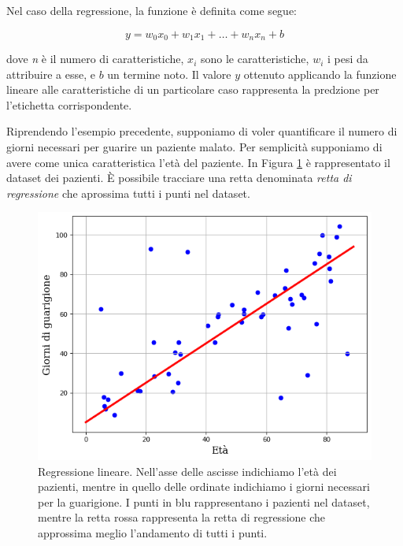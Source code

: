 \documentclass[a4paper,12pt]{report}
\begin{document}
Nel caso della regressione, la funzione è definita come segue: 

\begin{equation*}
    y  = w_0x_0 + w_1x_1 + \dots + w_nx_n + b
\end{equation*}

\noindent dove \textit{n} è il numero di caratteristiche, $x_i$ sono le caratteristiche, $w_i$ i pesi da attribuire a esse, e $b$ un termine noto.
Il valore $y$ ottenuto applicando la funzione lineare alle caratteristiche di un particolare caso rappresenta la predzione per l'etichetta corrispondente.

Riprendendo l'esempio precedente, supponiamo di voler quantificare il numero di giorni necessari per guarire un paziente malato. Per semplicità supponiamo di avere come unica caratteristica l'età del paziente. In Figura \ref{fig:linear_regression} è rappresentato il dataset dei pazienti. \`E possibile tracciare una retta denominata \textit{retta di regressione} che aprossima tutti i punti nel dataset.

\begin{figure}[h]
    \centering
    \includegraphics[scale=0.7]{images/regressione_lineare.png}
    \caption{Regressione lineare. Nell'asse delle ascisse indichiamo l'età dei pazienti, mentre in quello delle ordinate indichiamo i giorni necessari per la guarigione. I punti in blu rappresentano i pazienti nel dataset, mentre la retta rossa rappresenta la retta di regressione che approssima meglio l'andamento di tutti i punti.}
    \label{fig:linear_regression}

\end{figure}
\end{document}
